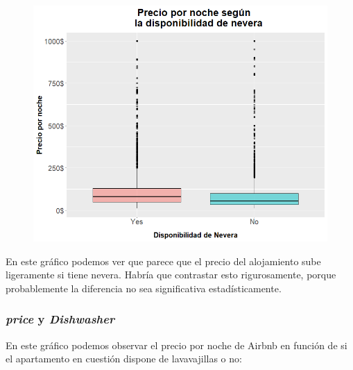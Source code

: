 \documentclass{article}
\begin{document}
\vspace{0.35cm}
\begin{figure}[h]
\hspace*{-0.15cm}
\centering
\includegraphics[scale = 0.6]{boxplot_precio_Refrigerator}
\end{figure}
\vspace{0.15cm}

En este gráfico podemos ver que parece que el precio del alojamiento sube ligeramente si tiene nevera. Habría que contrastar esto rigurosamente, porque probablemente la diferencia no sea significativa estadísticamente.

\clearpage
\subsubsection{\emph{price} y \emph{Dishwasher}}

En este gráfico podemos observar el precio por noche de Airbnb en función de si el apartamento en cuestión dispone de lavavajillas o no:
\end{document}
